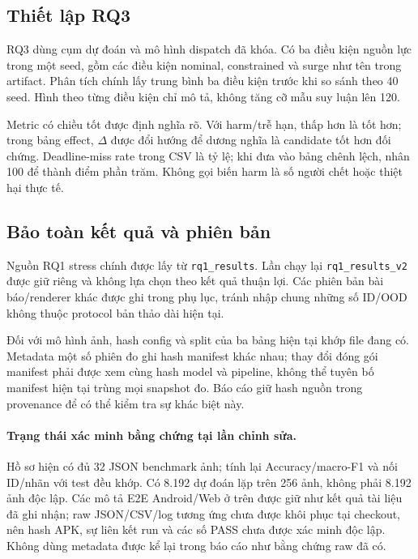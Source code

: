 \subsection{Thiết lập RQ3}
RQ3 dùng cụm dự đoán và mô hình dispatch đã khóa. Có ba điều kiện nguồn lực trong một seed, gồm các điều kiện nominal, constrained và surge như tên trong artifact. Phân tích chính lấy trung bình ba điều kiện trước khi so sánh theo 40 seed. Hình theo từng điều kiện chỉ mô tả, không tăng cỡ mẫu suy luận lên 120.

Metric có chiều tốt được định nghĩa rõ. Với harm/trễ hạn, thấp hơn là tốt hơn; trong bảng effect, $\Delta$ được đổi hướng để dương nghĩa là candidate tốt hơn đối chứng. Deadline-miss rate trong CSV là tỷ lệ; khi đưa vào bảng chênh lệch, nhân 100 để thành điểm phần trăm. Không gọi biến harm là số người chết hoặc thiệt hại thực tế.

\subsection{Bảo toàn kết quả và phiên bản}
Nguồn RQ1 stress chính được lấy từ \texttt{rq1\_results}. Lần chạy lại \texttt{rq1\_results\_v2} được giữ riêng và không lựa chọn theo kết quả thuận lợi. Các phiên bản bài báo/renderer khác được ghi trong phụ lục, tránh nhập chung những số ID/OOD không thuộc protocol bản thảo dài hiện tại.

Đối với mô hình ảnh, hash config và split của ba bảng hiện tại khớp file đang có. Metadata một số phiên đo ghi hash manifest khác nhau; thay đổi đóng gói manifest phải được xem cùng hash model và pipeline, không thể tuyên bố manifest hiện tại trùng mọi snapshot đo. Báo cáo giữ hash nguồn trong provenance để có thể kiểm tra sự khác biệt này.

\paragraph{Trạng thái xác minh bằng chứng tại lần chỉnh sửa.} Hồ sơ hiện có đủ 32 JSON benchmark ảnh; tính lại Accuracy/macro-F1 và nối ID/nhãn với test đều khớp. Có 8.192 dự đoán lặp trên 256 ảnh, không phải 8.192 ảnh độc lập. Các mô tả E2E Android/Web ở trên được giữ như kết quả tài liệu đã ghi nhận; raw JSON/CSV/log tương ứng chưa được khôi phục tại checkout, nên hash APK, sự liên kết run và các số PASS chưa được xác minh độc lập. Không dùng metadata được kể lại trong báo cáo như bằng chứng raw đã có.
